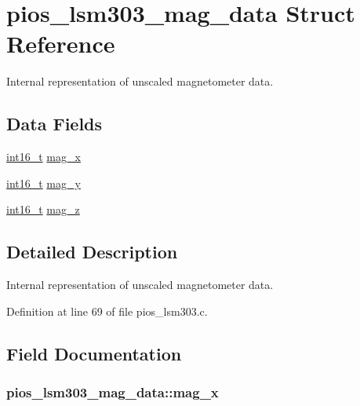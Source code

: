 \hypertarget{structpios__lsm303__mag__data}{\section{pios\-\_\-lsm303\-\_\-mag\-\_\-data Struct Reference}
\label{structpios__lsm303__mag__data}
}


Internal representation of unscaled magnetometer data.  


\subsection*{Data Fields}
\begin{DoxyCompactItemize}
\item 
\hyperlink{stdint_8h_aa343fa3b3d06292b959ffdd4c4703b06}{int16\-\_\-t} \hyperlink{structpios__lsm303__mag__data_ae632e8723dee3280f6672412cf5b67f1}{mag\-\_\-x}
\item 
\hyperlink{stdint_8h_aa343fa3b3d06292b959ffdd4c4703b06}{int16\-\_\-t} \hyperlink{structpios__lsm303__mag__data_a3365812478c4eab5da066f69f10ceacf}{mag\-\_\-y}
\item 
\hyperlink{stdint_8h_aa343fa3b3d06292b959ffdd4c4703b06}{int16\-\_\-t} \hyperlink{structpios__lsm303__mag__data_a2989fa1111551a8ec9135c7446bb0a03}{mag\-\_\-z}
\end{DoxyCompactItemize}


\subsection{Detailed Description}
Internal representation of unscaled magnetometer data. 

Definition at line 69 of file pios\-\_\-lsm303.\-c.



\subsection{Field Documentation}
\hypertarget{structpios__lsm303__mag__data_ae632e8723dee3280f6672412cf5b67f1}{
\subsubsection[{mag\-\_\-x}]{ pios\-\_\-lsm303\-\_\-mag\-\_\-data\-::mag\-\_\-x}}\label{structpios__lsm303__mag__data_ae632e8723dee3280f6672412cf5b67f1}


